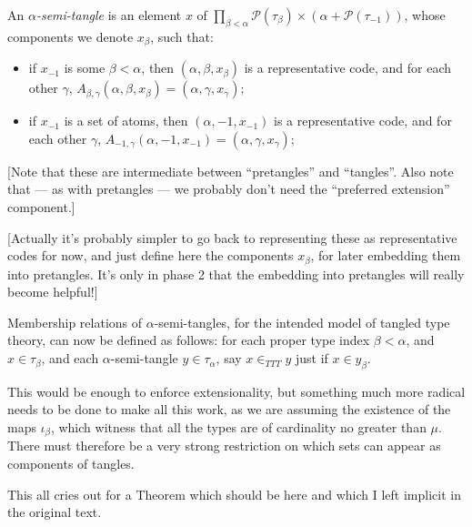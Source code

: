 \begin{definition}
  \label{def:semi-tangle}
  \leanok
  An \emph{$\alpha$-semi-tangle} is an element $x$ of $\prod_{\beta < \alpha}\mathcal P(\tau_\beta) \times (\alpha + \mathcal P(\tau_{-1}))$, whose components we denote $x_\beta$, such that:
  \begin{itemize}
    \item if $x_{-1}$ is some $\beta < \alpha$, then $(\alpha,\beta,x_\beta)$ is a representative code, and for each other $\gamma$, $A_{\beta,\gamma}(\alpha,\beta,x_\beta) = (\alpha,\gamma,x_\gamma)$;
    \item if $x_{-1}$ is a set of atoms, then $(\alpha,-1,x_{-1})$ is a representative code, and for each other $\gamma$, $A_{-1,\gamma}(\alpha,-1,x_{-1}) = (\alpha,\gamma,x_\gamma)$;
  \end{itemize}

  [Note that these are intermediate between “pretangles” and “tangles”.  Also note that — as with pretangles — we probably don’t need the “preferred extension” component.]

  [Actually it’s probably simpler to go back to representing these as representative codes for now, and just define here the components $x_\beta$, for later embedding them into pretangles.  It’s only in phase 2 that the embedding into pretangles will really become helpful!]
\end{definition}

\begin{definition}
\label{def:ttt-membership}
\leanok
  Membership relations of $\alpha$-semi-tangles, for the intended model of tangled type theory, can now be defined as follows: for each proper type index $\beta < \alpha$, and $x \in \tau_\beta$, and each $\alpha$-semi-tangle $y \in \tau_\alpha$, say $x \in_{TTT} y$ just if $x \in y_\beta$.
\end{definition}

This would be enough to enforce extensionality, but something much more radical needs to be done to make all this work, as we are assuming the existence of the maps $\iota_\beta$, which witness that all the types are of cardinality no greater than $\mu$.  There must therefore be a very strong restriction on which sets can appear as components of tangles.

This all cries out for a Theorem which should be here and which I left implicit in the original text.

